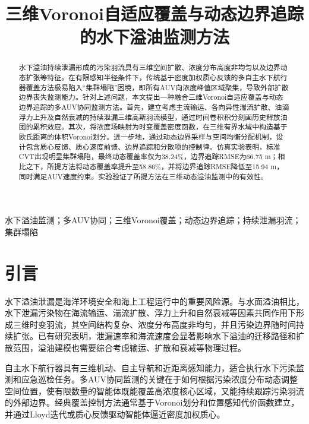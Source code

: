 \documentclass[conference]{IEEEtran}
\begin{document}
\title{三维Voronoi自适应覆盖与动态边界追踪的水下溢油监测方法}

\author{
}

\maketitle

\begin{abstract}
水下溢油持续泄漏形成的污染羽流具有三维空间扩散、浓度分布高度非均匀以及边界动态扩张等特征。在有限感知半径条件下，传统基于密度加权质心反馈的多自主水下航行器覆盖方法极易陷入“集群塌陷”困境，即所有AUV向浓度峰值区域聚集，导致外部扩散边界丧失监测能力。针对上述问题，本文提出一种融合三维Voronoi自适应覆盖与动态边界追踪的多AUV协同监测方法。首先，建立考虑主流输运、各向异性湍流扩散、油滴浮力上升及自然衰减的持续泄漏三维高斯羽流模型，通过时间卷积积分刻画历史释放油团的累积效应。其次，将浓度场映射为时变覆盖密度函数，在三维有界水域中构造基于欧氏距离的体积Voronoi划分。进一步地，通过动态边界采样与空间均衡分配机制，设计包含质心反馈、质心速度前馈、边界追踪和分散项的控制律。仿真实验表明，标准CVT出现明显集群塌陷，最终动态覆盖率仅为38.24\%，边界追踪RMSE为66.75 m；相比之下，所提方法将动态覆盖率提升至58.86\%，并将边界追踪RMSE降低至15.94 m，同时满足AUV速度约束。实验验证了所提方法在三维动态溢油监测中的有效性。
\end{abstract}

\begin{IEEEkeywords}
水下溢油监测；多AUV协同；三维Voronoi覆盖；动态边界追踪；持续泄漏羽流；集群塌陷
\end{IEEEkeywords}

\section{引言}
水下溢油泄漏是海洋环境安全和海上工程运行中的重要风险源。与水面溢油相比，水下泄漏污染物在海流输运、湍流扩散、浮力上升和自然衰减等因素共同作用下形成三维时变羽流，其空间结构复杂、浓度分布高度非均匀，并且污染边界随时间持续扩张。已有研究表明，泄漏速率和海流速度会显著影响水下溢油的迁移路径和扩散范围\cite{zhang2020oil}，溢油建模也需要综合考虑输运、扩散和衰减等物理过程\cite{fingas2022overview}。

自主水下航行器具有三维机动、自主导航和近距离感知能力，适合执行水下污染监测和应急巡检任务。多AUV协同监测的关键在于如何根据污染浓度分布动态调整空间位置，使有限数量的智能体既能覆盖高浓度核心区域，又能持续跟踪污染羽流的外部边界。经典覆盖控制方法通常基于Voronoi划分和位置感知代价函数建立\cite{cortes2004coverage}，并通过Lloyd迭代或质心反馈驱动智能体逼近密度加权质心\cite{du2006lloyd}。
\end{document}
